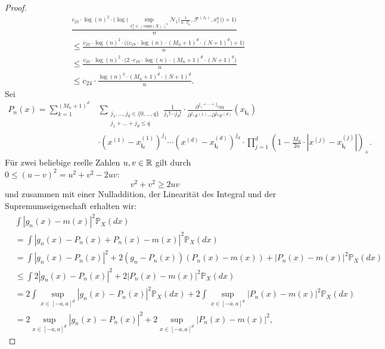 \begin{proof}
\begin{equation}
\label{lem9sol}
\begin{split}
& \frac{c_{23} \cdot \log(n)^2 \cdot \big(\log\big(\sup_{x_1^n \in (supp(X))^n}\mathcal{N}_1\big(\frac{1}{n \cdot \beta_n},\mathcal{F}^{(J_n)},x_1^n\big)\big) + 1\big)}{n} \\
& \leq \frac{c_{23} \cdot \log(n)^2 \cdot \big(\big(c_{19} \cdot \log(n) \cdot (M_n + 1)^d \cdot (N + 1)^d \big) + 1\big)}{n} \\
& \leq \frac{c_{23} \cdot \log(n)^2 \cdot \big(2 \cdot c_{19} \cdot \log(n) \cdot (M_n + 1)^d \cdot (N + 1)^d\big)}{n} \\
& \leq c_{24} \cdot \frac{\log(n)^3 \cdot (M_n + 1)^d \cdot (N + 1)^d}{n}.
\end{split}
\end{equation}
Sei 
\begin{equation*}
\begin{split}
P_n(x) = \sum_{k = 1}^{(M_n + 1)^d} & \sum_{\substack{ j_1,\dots,j_d \in \{0,\dots,q\} \\j_1+\dots +j_d \leq q}} \frac{1}{j_1! \cdots j_d!} \cdot \frac{\partial^{j_1+\cdots + j_d} m}{\partial^{j_1} x^{(1)}\cdots \partial^{j_d} x^{(d)}}(x_{\mathbf{i}_k}) \\
&  \cdot (x^{(1)} - x_{\mathbf{i}_k}^{(1)})^{j_1} \cdots (x^{(d)} - x_{\mathbf{i}_k}^{(d)})^{j_d} \cdot \prod_{j = 1}^d(1 - \frac{M_n}{2a} \cdot |x^{(j)} - x_{\mathbf{i}_k}^{(j)}|)_+. 
\end{split}
\end{equation*}
Für zwei beliebige reelle Zahlen $u, v \in \mathbb{R}$ gilt durch $0 \leq (u - v)^2 = u^2 + v^2 - 2uv$:
$$v^2 + v^2 \geq 2uv$$ und zusammen mit einer Nulladdition, der Linearität des Integral und der Supremumseigenschaft erhalten wir:
\begin{equation}
\label{gnmx}
\begin{split}
& \int |g_n(x) - m(x)|^2 \mathds{P}_X(dx) \\
& = \int |g_n(x) - P_n(x) + P_n(x) - m(x)|^2 \mathds{P}_X(dx) \\
& = \int |g_n(x) - P_n(x)|^2 + 2(g_n - P_n(x))(P_n(x) - m(x)) + |P_n(x) - m(x)|^2 \mathds{P}_X(dx) \\
& \leq \int 2 |g_n(x) - P_n(x)|^2 + 2 |P_n(x) - m(x)|^2 \mathds{P}_X(dx) \\
& = 2 \int \sup_{x \in [-a, a]^d} |g_n(x) - P_n(x)|^2 \mathds{P}_X(dx) + 2 \int \sup_{x \in [-a, a]^d} |P_n(x) - m(x)|^2 \mathds{P}_X(dx) \\
& = 2 \sup_{x \in [-a, a]^d} |g_n(x) - P_n(x)|^2 + 2 \sup_{x \in [-a, a]^d} |P_n(x) - m(x)|^2, 

\end{split}
\end{equation}
\end{proof}
